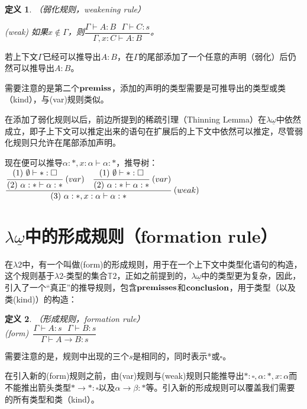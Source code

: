 \documentclass[UTF8]{article}
\newtheorem{thm}{定义}[section]
\begin{document}
		\begin{thm}（弱化规则，weakening rule）
			
			(weak) 如果$x\not\in\Gamma$，则$\dfrac{\Gamma\vdash A:B\ \ \ \Gamma\vdash C:s}{\Gamma,x:C\vdash A:B}$。
		\end{thm}
		
		若上下文$\Gamma$已经可以推导出$A:B$，在$\Gamma$的尾部添加了一个任意的声明（弱化）后仍然可以推导出$A:B$。
		
		需要注意的是第二个$\bf premiss$，添加的声明的类型需要是可推导出的类型或类（kind），与(var)规则类似。
		
		在添加了弱化规则以后，前边所提到的稀疏引理（Thinning Lemma）在$\lambda{\underline{\omega}}$中依然成立，即子上下文可以推定出来的语句在扩展后的上下文中依然可以推定，尽管弱化规则只允许在尾部添加声明。
		
		现在便可以推导$\alpha:*,x:\alpha\vdash\alpha:*$，推导树：\\
		
		$\cfrac{\cfrac{(1)\ \emptyset\vdash*:\square}{(2)\ \alpha:*\vdash\alpha:*}\ (var)\ \ \ \cfrac{(1)\ \emptyset\vdash*:\square}{(2)\ \alpha:*\vdash\alpha:*}\ (var)}{(3)\ \alpha:*,x:\alpha\vdash\alpha:*}\ (weak)$
		
	\section{$\lambda{\underline{\omega}}$中的形成规则（formation rule）}
		\noindent
		在$\lambda{2}$中，有一个叫做(form)的形成规则，用于在一个上下文中类型化语句的构造，这个规则基于$\lambda{2}$-类型的集合$\mathbb{T}2$，正如之前提到的，$\lambda{\underline{\omega}}$中的类型更为复杂，因此，引入了一个“真正”的推导规则，包含$\bf premisses$和$\bf conclusion$，用于类型（以及类(kind)）的构造：
		
		\begin{thm}（形成规则，formation rule）\\
			
			(form)\ $\dfrac{\Gamma\vdash A:s\ \ \ \Gamma\vdash B:s}{\Gamma\vdash A\rightarrow B:s}$
		\end{thm}
		
		需要注意的是，规则中出现的三个$s$是相同的，同时表示*或$\square$。
		
		在引入新的(form)规则之前，由(var)规则与(weak)规则只能推导出$*:\square,\alpha:*,x:\alpha$而不能推出箭头类型$*\rightarrow*:\square$以及$\alpha\rightarrow\beta:*$等。引入新的形成规则可以覆盖我们需要的所有类型和类（kind）。\\
		
\end{document}

